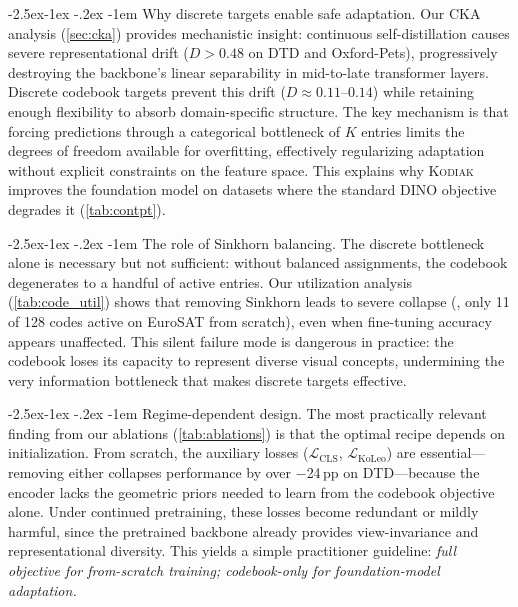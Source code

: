 \documentclass[runningheads]{llncs}
\makeatletter
\newcommand{\method}{\textsc{Kodiak}}
\renewcommand\paragraph{\@startsection{paragraph}{4}{\z@}%
  {-2.5ex\@plus -1ex \@minus -.2ex}%
  {-1em}%
  {\normalfont\normalsize\bfseries}}
\makeatother
\begin{document}
\paragraph{Why discrete targets enable safe adaptation.}
Our CKA analysis (\cref{sec:cka}) provides mechanistic insight: continuous self-distillation causes severe representational drift ($D > 0.48$ on DTD and Oxford-Pets), progressively destroying the backbone's linear separability in mid-to-late transformer layers.
Discrete codebook targets prevent this drift ($D \approx 0.11$--$0.14$) while retaining enough flexibility to absorb domain-specific structure.
The key mechanism is that forcing predictions through a categorical bottleneck of $K$ entries limits the degrees of freedom available for overfitting, effectively regularizing adaptation without explicit constraints on the feature space.
This explains why \method{} improves the foundation model on datasets where the standard DINO objective degrades it (\cref{tab:contpt}).

\paragraph{The role of Sinkhorn balancing.}
The discrete bottleneck alone is necessary but not sufficient: without balanced assignments, the codebook degenerates to a handful of active entries.
Our utilization analysis (\cref{tab:code_util}) shows that removing Sinkhorn leads to severe collapse (\eg, only 11 of 128 codes active on EuroSAT from scratch), even when fine-tuning accuracy appears unaffected.
This silent failure mode is dangerous in practice: the codebook loses its capacity to represent diverse visual concepts, undermining the very information bottleneck that makes discrete targets effective.

\paragraph{Regime-dependent design.}
The most practically relevant finding from our ablations (\cref{tab:ablations}) is that the optimal recipe depends on initialization.
From scratch, the auxiliary losses ($\mathcal{L}_{\text{CLS}}$, $\mathcal{L}_{\text{KoLeo}}$) are essential---removing either collapses performance by over $-$24\,pp on DTD---because the encoder lacks the geometric priors needed to learn from the codebook objective alone.
Under continued pretraining, these losses become redundant or mildly harmful, since the pretrained backbone already provides view-invariance and representational diversity.
This yields a simple practitioner guideline: \emph{full objective for from-scratch training; codebook-only for foundation-model adaptation.}
\end{document}
